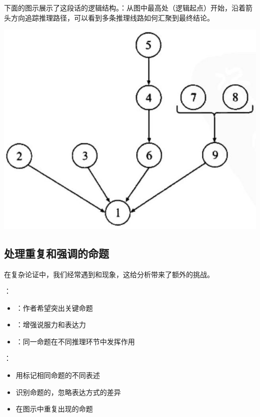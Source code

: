 下面的图示展示了这段话的逻辑结构。：从图中最高处（逻辑起点）开始，沿着箭头方向追踪推理路径，可以看到多条推理线路如何汇聚到最终结论。

\begin{center}
\includegraphics[width=\textwidth]{images/2025_05_15_6a28331d5e7c993ad07ag-072.jpg}
\end{center}

\subsection{处理重复和强调的命题}

在复杂论证中，我们经常遇到和现象，这给分析带来了额外的挑战。

\begin{theorembox}[title=处理重复命题的策略]
：
\begin{itemize}
  \item {}：作者希望突出关键命题
  \item {}：增强说服力和表达力
  \item {}：同一命题在不同推理环节中发挥作用
\end{itemize}

：
\begin{itemize}
  \item 用标记相同命题的不同表述
  \item 识别命题的，忽略表达方式的差异
  \item 在图示中重复出现的命题
\end{itemize}
\end{theorembox}

